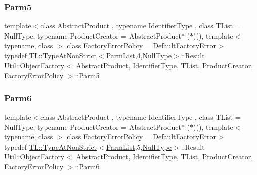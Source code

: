 \subsubsection{\texorpdfstring{Parm5}{Parm5}\hspace{0.1cm}{\footnotesize\ttfamily [3/3]}}
{\footnotesize\ttfamily template$<$class Abstract\+Product , typename Identifier\+Type , class T\+List  = Null\+Type, typename Product\+Creator  = Abstract\+Product$\ast$ ($\ast$)(), template$<$ typename, class $>$ class Factory\+Error\+Policy = Default\+Factory\+Error$>$ \\
typedef \mbox{\hyperlink{structUtil_1_1TL_1_1TypeAtNonStrict}{T\+L\+::\+Type\+At\+Non\+Strict}}$<$\mbox{\hyperlink{classUtil_1_1ObjectFactory_a46f003a5928e8a60140e0a74ac261c36}{Parm\+List}},4,\mbox{\hyperlink{classUtil_1_1NullType}{Null\+Type}}$>$\+::Result \mbox{\hyperlink{classUtil_1_1ObjectFactory}{Util\+::\+Object\+Factory}}$<$ Abstract\+Product, Identifier\+Type, T\+List, Product\+Creator, Factory\+Error\+Policy $>$\+::\mbox{\hyperlink{classUtil_1_1ObjectFactory_a11006cc1ea90957dd8e5604c2d9e069d}{Parm5}}}

\mbox{\label{classUtil_1_1ObjectFactory_a9f80d25e0964c0e4c204373cd651397a}} 
\subsubsection{\texorpdfstring{Parm6}{Parm6}\hspace{0.1cm}{\footnotesize\ttfamily [1/3]}}
{\footnotesize\ttfamily template$<$class Abstract\+Product , typename Identifier\+Type , class T\+List  = Null\+Type, typename Product\+Creator  = Abstract\+Product$\ast$ ($\ast$)(), template$<$ typename, class $>$ class Factory\+Error\+Policy = Default\+Factory\+Error$>$ \\
typedef \mbox{\hyperlink{structUtil_1_1TL_1_1TypeAtNonStrict}{T\+L\+::\+Type\+At\+Non\+Strict}}$<$\mbox{\hyperlink{classUtil_1_1ObjectFactory_a46f003a5928e8a60140e0a74ac261c36}{Parm\+List}},5,\mbox{\hyperlink{classUtil_1_1NullType}{Null\+Type}}$>$\+::Result \mbox{\hyperlink{classUtil_1_1ObjectFactory}{Util\+::\+Object\+Factory}}$<$ Abstract\+Product, Identifier\+Type, T\+List, Product\+Creator, Factory\+Error\+Policy $>$\+::\mbox{\hyperlink{classUtil_1_1ObjectFactory_a9f80d25e0964c0e4c204373cd651397a}{Parm6}}}


